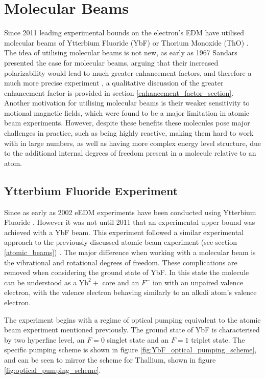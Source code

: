 \section{Molecular Beams}

Since 2011 leading experimental bounds on the electron's EDM have utilised molecular beams of Ytterbium Fluoride (YbF) \cite{Hudson_2011} or Thorium Monoxide (ThO) \cite{ACME_2014, ACME_2018}. The idea of utilising molecular beams is not new, as early as 1967 Sandars presented the case for molecular beams, arguing that their increased polarizability would lead to much greater enhancement factors, and therefore a much more precise experiment \cite{Sandars_1967}, a qualitative discussion of the greater enhancement factor is provided in section \ref{enhancement_factor_section}. Another motivation for utilising molecular beams is their weaker sensitivity to motional magnetic fields, which were found to be a major limitation in atomic beam experiments. However, despite these benefits these molecules pose major challenges in practice, such as being highly reactive, making them hard to work with in large numbers, as well as having more complex energy level structure, due to the additional internal degrees of freedom present in a molecule relative to an atom.

\subsection{Ytterbium Fluoride Experiment} \label{YbF_experiment}

Since as early as 2002 eEDM experiments have been conducted using Ytterbium Fluoride \cite{Hudson_2002}. However it was not until 2011 that an experimental upper bound was achieved with a YbF beam. This experiment followed a similar experimental approach to the previously discussed atomic beam experiment (see section \ref{atomic_beams}) \cite{Kara_2012}. The major difference when working with a molecular beam is the vibrational and rotational degrees of freedom. These complications are removed when considering the ground state of YbF. In this state the molecule can be understood as a $\text{Yb}^2+$ core and an $F^-$ ion with an unpaired valence electron, with the valence electron behaving similarly to an alkali atom's valence electron.

The experiment begins with a regime of optical pumping equivalent to the atomic beam experiment mentioned previously. The ground state of YbF is characterised by two hyperfine level, an $F=0$ singlet state and an $F=1$ triplet state. The specific pumping scheme is shown in figure \ref{fig:YbF_optical_pumping_scheme}, and can be seen to mirror the scheme for Thallium, shown in figure \ref{fig:optical_pumping_scheme}.

